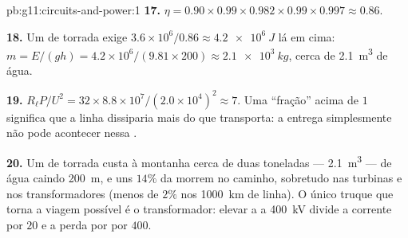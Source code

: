\begin{solution}{pb:g11:circuits-and-power:1}
\textbf{17.} $\eta = 0.90 \times 0.99 \times 0.982 \times 0.99 \times
0.997 \approx 0.86$.

\textbf{18.} Um  de torrada exige
$3.6\times10^{6}/0.86 \approx \qty{4.2e6}{J}$ lá em cima:
$m = E/(gh) = 4.2\times10^{6}/(9.81 \times 200) \approx \qty{2.1e3}{kg}$,
cerca de \qty{2.1}{m^3} de água.

\textbf{19.} $R_\ell P/U^2 = 32 \times 8.8\times10^{7}/(2.0\times
10^{4})^2 \approx 7$. Uma ``fração'' acima de $1$ significa que a linha
dissiparia mais do que transporta: a entrega simplesmente não pode
acontecer nessa .

\textbf{20.} Um  de torrada custa à montanha cerca de duas
toneladas --- \qty{2.1}{m^3} --- de água caindo \qty{200}{m}, e uns
$14\%$ da  morrem no caminho, sobretudo nas turbinas e nos
transformadores (menos de $2\%$ nos \qty{1000}{km} de linha). O único
truque que torna a viagem possível é o transformador: elevar a  a
\qty{400}{kV} divide a corrente por $20$ e a perda por  por
$400$.
\end{solution}
